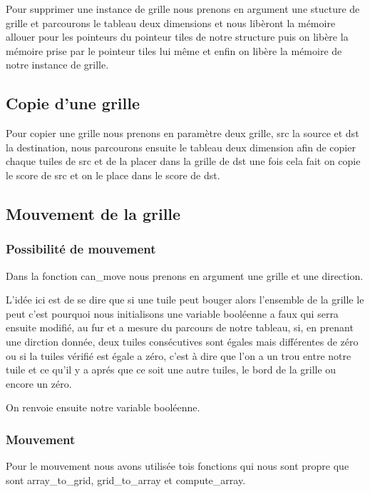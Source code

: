 \documentclass{article}
\begin{document}
Pour supprimer une instance de grille nous prenons en argument une stucture de grille et parcourons le tableau deux dimensions et nous libèront la mémoire allouer pour les pointeurs du pointeur tiles de notre structure puis on libère la mémoire prise par le pointeur tiles lui même et enfin on libère la mémoire de notre instance de grille.

\subsection{Copie d'une grille}

Pour copier une grille nous prenons en paramètre deux grille, src la source et dst la destination, nous parcourons ensuite le tableau deux dimension afin de copier chaque tuiles de src et de la placer dans la grille de dst une fois cela fait on copie le score de src et on le place dans le score de dst.

\subsection{Mouvement de la grille}
\subsubsection{Possibilité de mouvement}

Dans la fonction can\_move nous prenons en argument une grille et une direction.

L'idée ici est de se dire que si une tuile peut bouger alors l'ensemble de la grille le peut c'est pourquoi nous initialisons une variable booléenne a faux qui serra ensuite modifié, au fur et a mesure du parcours de notre tableau, si, en prenant une dirction donnée, deux tuiles consécutives sont égales mais différentes de zéro ou si la tuiles vérifié est égale a zéro, c'est à dire que l'on a un trou entre notre tuile et ce qu'il y a aprés que ce soit une autre tuiles, le bord de la grille ou encore un zéro.

On renvoie ensuite notre variable booléenne.

\subsubsection{Mouvement}

Pour le mouvement nous avons utilisée tois fonctions qui nous sont propre que sont array\_to\_grid, grid\_to\_array et compute\_array.\\
\end{document}
